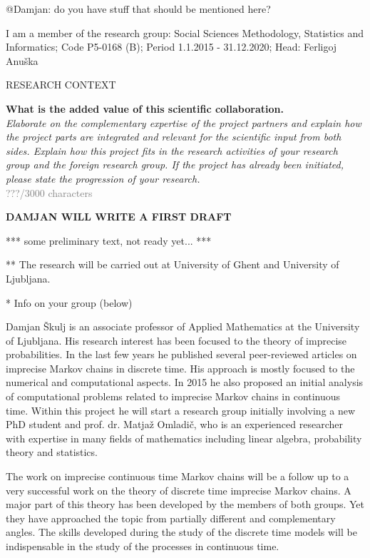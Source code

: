 \documentclass[11pt,dvipsnames,usenames,a4paper]{article}
\begin{document}
@Damjan: do you have stuff that should be mentioned here?

I am a member of the research group: Social Sciences Methodology, Statistics and Informatics; 
Code	P5-0168 (B); Period	1.1.2015 - 31.12.2020; Head:	Ferligoj Anuška

\vspace{7pt}




\vspace{5mm}

\begin{shaded}\centering RESEARCH CONTEXT \end{shaded}
\textbf{What is the added value of this scientific collaboration.}\\
\textit{Elaborate on the complementary expertise of the project partners and explain how the project parts are integrated and relevant for the scientific input from both sides. Explain how this project fits in the research activities of your research group and the foreign research group. If the project has already been initiated, please state the progression of your research.}\\
\textcolor{Gray}{???/3000 characters}

{\color{blue}\bf DAMJAN WILL WRITE A FIRST DRAFT}

*** some preliminary text, not ready yet... ***

**
The research will be carried out at University of Ghent and University of Ljubljana. 

* Info on your group (below) 


Damjan \v Skulj is an associate professor of Applied Mathematics at the University of Ljubljana. His research interest has been focused to the theory of imprecise probabilities. In the last few years he published several peer-reviewed articles on imprecise Markov chains in discrete time. His approach is mostly focused to the numerical and computational aspects. In 2015 he also proposed an initial analysis of computational problems related to imprecise Markov chains in continuous time. Within this project he will start a research group initially involving a new PhD student and prof. dr. Matjaž Omladič, who is an experienced researcher with expertise in many fields of mathematics including linear algebra, probability theory and statistics. 

The work on imprecise continuous time Markov chains will be a follow up to a very successful work on the theory of discrete time imprecise Markov chains. A major part of this theory has been developed by the members of both groups. Yet they have approached the topic from partially different and complementary angles. The skills developed during the study of the discrete time models will be indispensable in the study of the processes in continuous time. 
\end{document}
